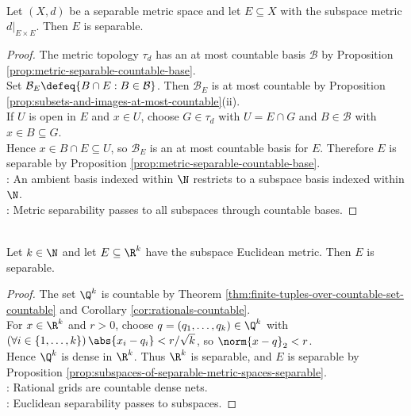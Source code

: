 \begin{proposition} \label{prop:subspaces-of-separable-metric-spaces-separable} \\
Let $(X,d)$ be a separable metric space and let $E\subseteq X$ with the subspace metric $d|_{E\times E}$. Then $E$ is separable.
\begin{proof}
The metric topology $\tau_d$ has an at most countable basis $\mathcal{B}$ by Proposition \ref{prop:metric-separable-countable-base}.\\
Set $\mathcal{B}_E\defeq\{B\cap E:B\in\mathcal{B}\}$. Then $\mathcal{B}_E$ is at most countable by Proposition \ref{prop:subsets-and-images-at-most-countable}(ii).\\
If $U$ is open in $E$ and $x\in U$, choose $G\in\tau_d$ with $U=E\cap G$ and $B\in\mathcal{B}$ with $x\in B\subseteq G$.\\
Hence $x\in B\cap E\subseteq U$, so $\mathcal{B}_E$ is an at most countable basis for $E$. Therefore $E$ is separable by Proposition \ref{prop:metric-separable-countable-base}.\\
: An ambient basis indexed within $\N$ restricts to a subspace basis indexed within $\N$.\\
: Metric separability passes to all subspaces through countable bases.
\end{proof}
\end{proposition}

\begin{corollary} \label{cor:euclidean-subsets-separable} \\
Let $k\in\N$ and let $E\subseteq\R^k$ have the subspace Euclidean metric. Then $E$ is separable.
\begin{proof} The set $\Q^k$ is countable by Theorem \ref{thm:finite-tuples-over-countable-set-countable} and Corollary \ref{cor:rationals-countable}.\\
For $x\in\R^k$ and $r>0$, choose $q=(q_1,\ldots,q_k)\in\Q^k$ with $(\forall i\in\{1,\ldots,k\})\,\abs{x_i-q_i}<r/\sqrt{k}$, so $\norm{x-q}_2<r$.\\
Hence $\Q^k$ is dense in $\R^k$. Thus $\R^k$ is separable, and $E$ is separable by Proposition \ref{prop:subspaces-of-separable-metric-spaces-separable}.\\
: Rational grids are countable dense nets.\\
: Euclidean separability passes to subspaces.
\end{proof}
\end{corollary}

